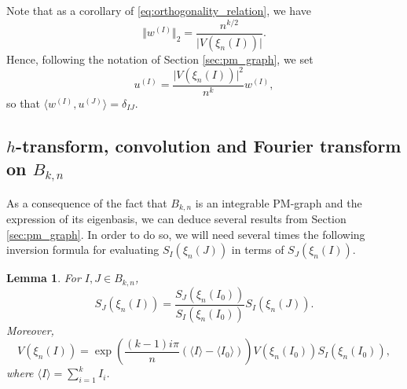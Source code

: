 \documentclass[10pt,11pt]{amsart}%
\newtheorem{lemma}[theorem]{Lemma}
\begin{document}
Note that as a corollary of \eqref{eq:orthogonality_relation}, we have 
$$\Vert w^{(I)}\Vert_2=\frac{n^{k/2}}{\vert V(\xi_{n}(I))\vert}.$$
Hence, following the notation of Section \ref{sec:pm_graph}, we set 
\begin{equation}\label{eq:def_uI_Bkn}
u^{(I)}=\frac{\vert V(\xi_{n}(I))\vert^2}{n^k}w^{(I)},
\end{equation}
so that $\langle w^{(I)},u^{(J)}\rangle=\delta_{IJ}$.
\subsection{$h$-transform, convolution and Fourier transform on $B_{k,n}$}
As a consequence of the fact that $B_{k,n}$ is an integrable PM-graph and the expression of its eigenbasis, we can deduce several results from Section \ref{sec:pm_graph}. In order to do so, we will need several times the following inversion formula for evaluating $S_{I}(\xi_{n}(J))$ in terms of $S_{J}(\xi_{n}(I))$.
\begin{lemma}\label{lem:formula_inversion_Schur}
For $I,J\in  B_{k,n}$,
$$S_J(\xi_{n}(I))=\frac{S_J(\xi_{n}(I_0))}{S_I(\xi_{n}(I_0))}S_I(\xi_{n}(J)).$$
Moreover,
$$V(\xi_{n}(I))=\exp\left(\frac{(k-1)i\pi}{n}\left(\langle I\rangle-\langle I_0\rangle\right)\right)V(\xi_{n}(I_0))S_I(\xi_{n}(I_0)),$$
where $\langle I\rangle=\sum_{i=1}^kI_i$.
\end{lemma}
\end{document}
